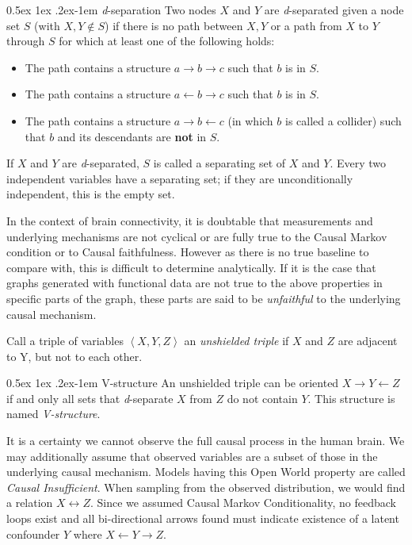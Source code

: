 \documentclass[a4paper, english]{article}
\makeatletter
\renewcommand{\paragraph}{%
  \@startsection{paragraph}{4}%
  {\z@}{0.5ex \@plus 1ex \@minus .2ex}{-1em}%
  {\normalfont\normalsize\bfseries}%
}
\makeatother
\begin{document}
\paragraph{\textit{d}-separation}
Two nodes $X$ and $Y$ are \textit{d}-separated given a node set $S$ (with $X, Y \notin S$) if there is no path between $X,Y$ or a path from $X$ to $Y$ through $S$ for which at least one of the following holds:
\begin{itemize}
\item The path contains a structure $a \rightarrow b \rightarrow c$ such that $b$ is in $S$.
\item The path contains a structure $a \leftarrow b \rightarrow c$ such that $b$ is in $S$.
\item The path contains a structure $a \rightarrow b \leftarrow c$ (in which $b$ is called a collider) such that $b$ and its descendants are \textbf{not} in $S$.
\end{itemize}
If $X$ and $Y$ are \textit{d}-separated, $S$ is called a separating set of $X$ and $Y$.
Every two independent variables have a separating set; if they are unconditionally independent, this is the empty set.

In the context of brain connectivity, it is doubtable that measurements and underlying mechanisms are not cyclical or are fully true to the Causal Markov condition or to Causal faithfulness.
However as there is no true baseline to compare with, this is difficult to determine analytically.
If it is the case that graphs generated with functional data are not true to the above properties in specific parts of the graph, these parts are said to be \textit{unfaithful} to the underlying causal mechanism.

Call a triple of variables $\left < X,Y,Z \right >$ an \textit{unshielded triple} if $X$ and $Z$ are adjacent to Y, but not to each other.

\paragraph{V-structure}
An unshielded triple can be oriented $X \rightarrow Y \leftarrow Z$ if and only all sets that \textit{d}-separate $X$ from $Z$ do not contain $Y$.
This structure is named \textit{V-structure}.

It is a certainty we cannot observe the full causal process in the human brain.
We may additionally assume that observed variables are a subset of those in the underlying causal mechanism.
Models having this Open World property are called \textit{Causal Insufficient}.
When sampling from the observed distribution, we would find a relation $X \leftrightarrow Z$.
Since we assumed Causal Markov Conditionality, no feedback loops exist and all bi-directional arrows found must indicate existence of a latent confounder $Y$ where $X \leftarrow Y \rightarrow Z$.
\end{document}
